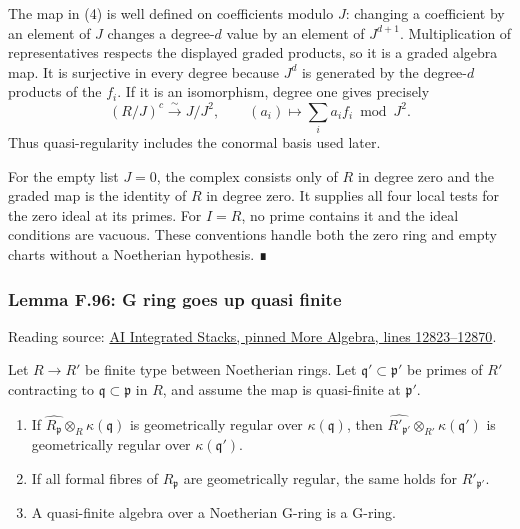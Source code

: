 \documentclass[11pt,a4paper,openany]{report}
\providecommand{\tightlist}{\setlength{\itemsep}{0pt}\setlength{\parskip}{0pt}}
\begin{document}
The map in (4) is well defined on coefficients modulo \(J\): changing a coefficient by an element of \(J\) changes a degree-\(d\) value by an element of \(J^{d+1}\). Multiplication of representatives respects the displayed graded products, so it is a graded algebra map. It is surjective in every degree because \(J^d\) is generated by the degree-\(d\) products of the \(f_i\). If it is an isomorphism, degree one gives precisely \[
(R/J)^c\overset{\sim}{\longrightarrow}J/J^2,
\qquad (a_i)\longmapsto\sum_i a_if_i\bmod J^2.
\] Thus quasi-regularity includes the conormal basis used later.

For the empty list \(J=0\), the complex consists only of \(R\) in degree zero and the graded map is the identity of \(R\) in degree zero. It supplies all four local tests for the zero ideal at its primes. For \(I=R\), no prime contains it and the ideal conditions are vacuous. These conventions handle both the zero ring and empty charts without a Noetherian hypothesis. ∎

\label{AG-RG-S05-more-algebra-lemma-G-ring-goes-up-quasi-finite}

\subsubsection{Lemma F.96: G ring goes up quasi finite}\label{AG-RG-S05-lemma-f.96-g-ring-goes-up-quasi-finite}

Reading source: \href{https://github.com/KokunoYumeto/unofficial-stacks-project-ai-drafts/blob/565b10e987aba5969b21145a0833f42d69f96790/more-algebra.tex\#L12823-L12870}{AI Integrated Stacks, pinned More Algebra, lines 12823--12870}.

Let \(R\to R'\) be finite type between Noetherian rings. Let \(\mathfrak q'\subset\mathfrak p'\) be primes of \(R'\) contracting to \(\mathfrak q\subset\mathfrak p\) in \(R\), and assume the map is quasi-finite at \(\mathfrak p'\).

\begin{enumerate}
\def\labelenumi{\arabic{enumi}.}
\tightlist
\item
  If \(\widehat{R_{\mathfrak p}}\otimes_R\kappa(\mathfrak q)\) is geometrically regular over \(\kappa(\mathfrak q)\), then \(\widehat{R'_{\mathfrak p'}}\otimes_{R'}\kappa(\mathfrak q')\) is geometrically regular over \(\kappa(\mathfrak q')\).
\item
  If all formal fibres of \(R_{\mathfrak p}\) are geometrically regular, the same holds for \(R'_{\mathfrak p'}\).
\item
  A quasi-finite algebra over a Noetherian G-ring is a G-ring.
\end{enumerate}
\end{document}
